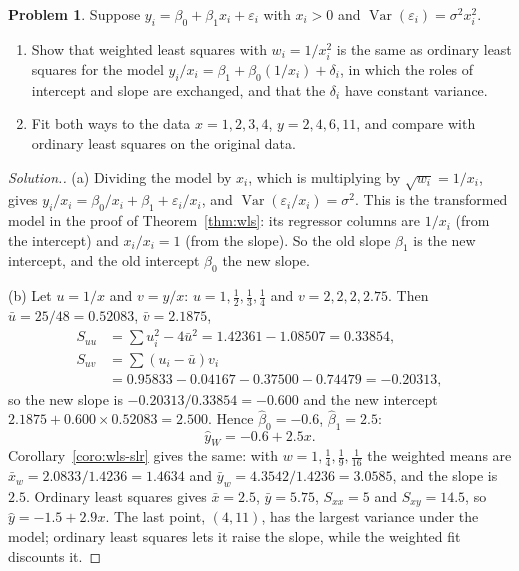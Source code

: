 \documentclass[11pt,a4paper]{article}
\numberwithin{equation}{section}
\theoremstyle{definition}
\newtheorem{problemx}{Problem}[subsection]
\newenvironment{problem}{\begin{problemx}}{\end{problemx}}
\newenvironment{solution}
  {\renewcommand{\qedsymbol}{}\begin{proof}[\textit{Solution}.]}
  {\end{proof}}
\begin{document}
\begin{problem}\label{prob:wls-x}
Suppose $y_i = \beta_0 + \beta_1 x_i + \varepsilon_i$ with $x_i > 0$ and $\operatorname{Var}(\varepsilon_i) = \sigma^2x_i^2$.
\begin{enumerate}[label=(\alph*)]
\item Show that weighted least squares with $w_i = 1/x_i^2$ is the same as ordinary least squares
for the model $y_i/x_i = \beta_1 + \beta_0(1/x_i) + \delta_i$, in which the roles of intercept and slope
are exchanged, and that the $\delta_i$ have constant variance.
\item Fit both ways to the data $x = 1, 2, 3, 4$, $y = 2, 4, 6, 11$, and compare with ordinary least
squares on the original data.
\end{enumerate}
\end{problem}

\begin{solution}
(a) Dividing the model by $x_i$, which is multiplying by $\sqrt{w_i} = 1/x_i$, gives
$y_i/x_i = \beta_0/x_i + \beta_1 + \varepsilon_i/x_i$, and $\operatorname{Var}(\varepsilon_i/x_i) = \sigma^2$. This is the
transformed model in the proof of Theorem~\ref{thm:wls}: its regressor columns are $1/x_i$ (from the
intercept) and $x_i/x_i = 1$ (from the slope). So the old slope $\beta_1$ is the new intercept, and the
old intercept $\beta_0$ the new slope.

(b) Let $u = 1/x$ and $v = y/x$: $u = 1, \frac12, \frac13, \frac14$ and $v = 2, 2, 2, 2.75$. Then
$\bar u = 25/48 = 0.52083$, $\bar v = 2.1875$,
\begin{align*}
S_{uu} &= \textstyle\sum u_i^2 - 4\bar u^2 = 1.42361 - 1.08507 = 0.33854, \\
S_{uv} &= \textstyle\sum (u_i - \bar u)v_i \\
&= 0.95833 - 0.04167 - 0.37500 - 0.74479 = -0.20313 ,
\end{align*}
so the new slope is $-0.20313/0.33854 = -0.600$ and the new intercept
$2.1875 + 0.600 \times 0.52083 = 2.500$. Hence $\hat\beta_0 = -0.6$, $\hat\beta_1 = 2.5$:
\[
\hat y_W = -0.6 + 2.5x .
\]
Corollary~\ref{coro:wls-slr} gives the same: with $w = 1, \frac14, \frac19, \frac1{16}$ the weighted means
are $\bar x_w = 2.0833/1.4236 = 1.4634$ and $\bar y_w = 4.3542/1.4236 = 3.0585$, and the
slope is $2.5$. Ordinary least squares gives
$\bar x = 2.5$, $\bar y = 5.75$, $S_{xx} = 5$ and $S_{xy} = 14.5$, so
$\hat y = -1.5 + 2.9x$. The last
point, $(4, 11)$, has the largest variance under the model; ordinary least squares lets it raise the
slope, while the weighted fit discounts it.
\end{solution}
\end{document}
